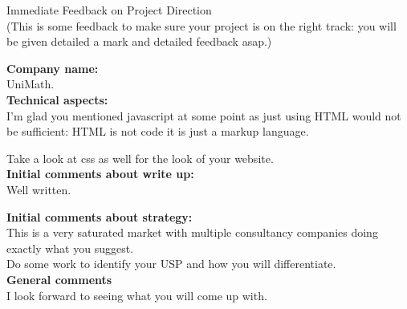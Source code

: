 \documentclass{article}
\begin{document}
\begin{center}
\Huge{Immediate Feedback on Project Direction}\\
\tiny{(This is some feedback to make sure your project is on the right track: you will be given detailed a mark and detailed feedback asap.)}
\end{center}


\normalsize
\textbf{Company name:}\\

UniMath. \\

\textbf{Technical aspects:}\\

I'm glad you mentioned javascript at some point as just using HTML would not be sufficient: HTML is not code it is just a markup language.

Take a look at css as well for the look of your website.\\

\textbf{Initial comments about write up:}\\

Well written.

\textbf{Initial comments about strategy:}\\

This is a very saturated market with multiple consultancy companies doing exactly what you suggest.\\
Do some work to identify your USP and how you  will differentiate.\\

\textbf{General comments}\\

I look forward to seeing what you will come up with.
\end{document}
